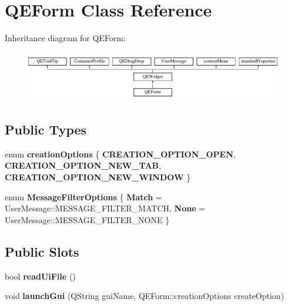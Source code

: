 \hypertarget{classQEForm}{
\section{QEForm Class Reference}
\label{classQEForm}
}
Inheritance diagram for QEForm:\begin{figure}[H]
\begin{center}
\leavevmode
\includegraphics[height=2.204725cm]{classQEForm}
\end{center}
\end{figure}
\subsection*{Public Types}
\begin{DoxyCompactItemize}
\item 
enum {\bfseries creationOptions} \{ {\bfseries CREATION\_\-OPTION\_\-OPEN}, 
{\bfseries CREATION\_\-OPTION\_\-NEW\_\-TAB}, 
{\bfseries CREATION\_\-OPTION\_\-NEW\_\-WINDOW}
 \}
\item 
enum {\bfseries MessageFilterOptions} \{ {\bfseries Match} =  UserMessage::MESSAGE\_\-FILTER\_\-MATCH, 
{\bfseries None} =  UserMessage::MESSAGE\_\-FILTER\_\-NONE
 \}
\end{DoxyCompactItemize}
\subsection*{Public Slots}
\begin{DoxyCompactItemize}
\item 
\hypertarget{classQEForm_a2836ba4b39a104daa5fa860e59017695}{
bool {\bfseries readUiFile} ()}
\label{classQEForm_a2836ba4b39a104daa5fa860e59017695}

\item 
\hypertarget{classQEForm_abf486b58f80836901734d3ac1928b844}{
void {\bfseries launchGui} (QString guiName, QEForm::creationOptions createOption)}
\label{classQEForm_abf486b58f80836901734d3ac1928b844}

\end{DoxyCompactItemize}
